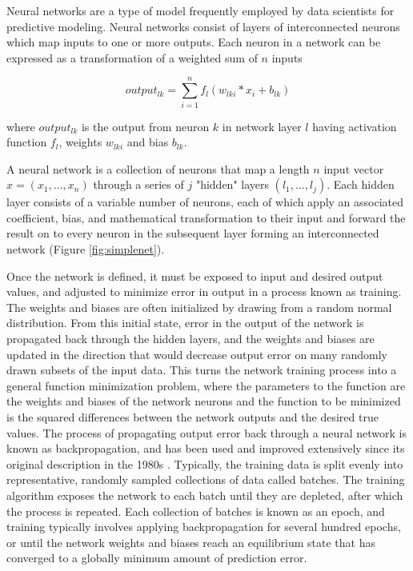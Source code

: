 Neural networks are a type of model frequently employed by data scientists
for predictive modeling. Neural networks consist of layers of interconnected neurons
which map inputs to one or more outputs. Each neuron in a network can be expressed as a 
transformation of a weighted sum of $n$ inputs 

\begin{equation}
output_{lk} = \sum_{i=1}^{n} f_l(w_{lki} * x_{i} + b_{lk})
\label{eq:neuron}
\end{equation}

where $output_{lk}$ is the output from neuron $k$ in network layer $l$ having activation
function $f_l$, weights $w_{lki}$ and bias $b_{lk}$.

A neural network is a collection of neurons that map a 
length $n$ input vector $x = (x_1, ..., x_n)$ through a series of $j$ 
"hidden" layers $(l_1, ..., l_j)$. Each hidden layer consists of a variable 
number of neurons, each of which apply an associated coefficient, bias, and 
mathematical transformation to their input and forward the 
result on to every neuron in the subsequent layer forming an interconnected 
network (Figure \ref{fig:simplenet}).

\ifdefined\showtablesandfigures
\fi

Once the network is defined, it must be exposed to input and desired output
values, and adjusted to minimize error in output in a process known as training.
The weights and biases are often initialized by drawing from a
random normal distribution. From this initial state, error in 
the output of the network is propagated back through the hidden 
layers, and the weights and biases are updated in the direction that would 
decrease output error on many randomly drawn subsets of the input data. 
This turns the network training process into a general 
function minimization problem, where the parameters to the function are the 
weights and biases of the network neurons and the function to be 
minimized is the squared differences between the network outputs and 
the desired true values. The process of propagating output error back 
through a neural network is known as backpropagation, and has been used 
and improved extensively since its original description in the 
1980s \citep{rumelhart1986}.  Typically, the training data is split 
evenly into representative, randomly sampled collections of data 
called batches. The training algorithm exposes the network to each 
batch until they are depleted, after which the process is repeated. Each 
collection of batches is known as an epoch, and training typically 
involves applying backpropagation for several hundred epochs, or until the network
weights and biases reach an equilibrium state that has converged to a 
globally minimum amount of prediction error.

